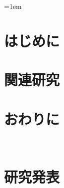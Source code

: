 
\parindent=1em

\clearpage
\pagestyle{headings}


\chapter{はじめに}
\label{chap:introduction}



\chapter{関連研究}
\label{chap:related_research}


\chapter{おわりに}
\label{chap:conclusion}




% 
% 
% 




\acknowledgement　%



\chapter*{研究発表}




